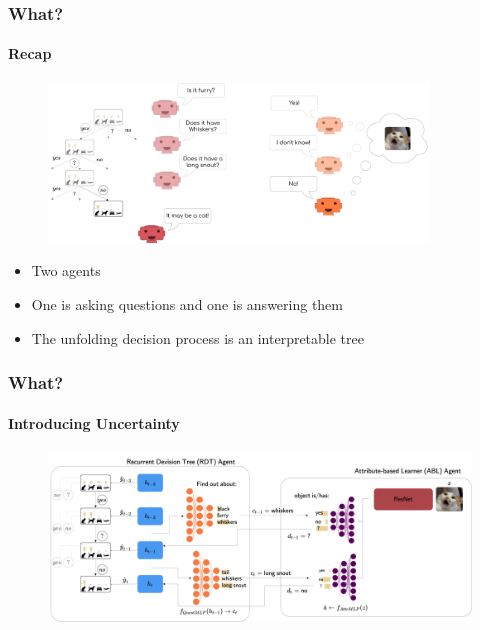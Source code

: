 \documentclass[9pt]{beamer}
\begin{document}
\begin{frame}
\frametitle{What?}
\framesubtitle{Recap}
\begin{figure}
	\centering
	\includegraphics[width=0.9\textwidth]{images/urdtc_intuition.pdf}
\end{figure}
\begin{itemize}\setlength\itemsep{1em}
	\item Two agents
	\item One is asking questions and one is answering them
	\item The unfolding decision process is an interpretable tree
\end{itemize}
\end{frame} 


\begin{frame}
\frametitle{What?}
\framesubtitle{Introducing Uncertainty}
\begin{figure}
	\centering
	\includegraphics[width=1\textwidth]{images/uncertaintRDTC.pdf} 
	\label{fig:uncertainRDTC}
\end{figure}
\end{frame} 
\end{document}
